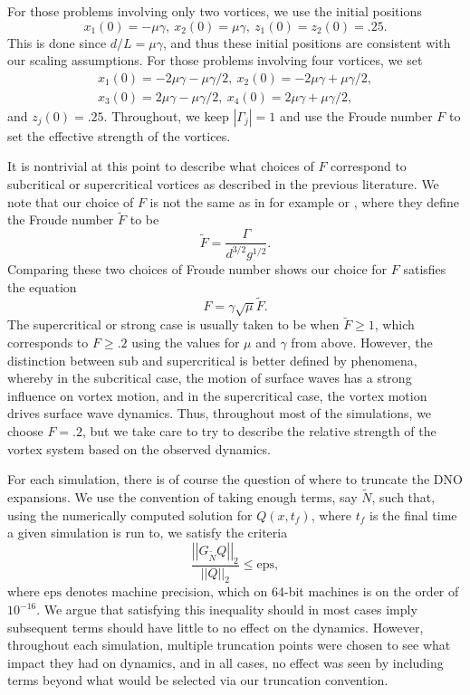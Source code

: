 \documentclass[a4paper,11pt]{article}
\newcommand{\gnorm}[1]{\left|\left| #1\right|\right|}
\begin{document}
For those problems involving only two vortices, we use the initial positions
\[
x_{1}(0)=-\mu\gamma, ~x_{2}(0)=\mu\gamma, ~z_{1}(0)=z_{2}(0)=.25.
\]
This is done since $d/L=\mu\gamma$, and thus these initial positions are consistent with our scaling assumptions.  For those problems involving four vortices, we set 
\begin{align*}
x_{1}(0)=-2\mu\gamma-\mu\gamma/2, ~ x_{2}(0)=-2\mu\gamma+\mu\gamma/2,\\ x_{3}(0)=2\mu\gamma-\mu\gamma/2, ~ x_{4}(0)=2\mu\gamma+\mu\gamma/2,
\end{align*}
and $z_{j}(0)=.25$.  Throughout, we keep $|\Gamma_{j}|=1$ and use the Froude number $F$ to set the effective strength of the vortices.  

It is nontrivial at this point to describe what choices of $F$ correspond to subcritical or supercritical vortices as described in the previous literature.  We note that our choice of $F$ is not the same as in for example \cite{tyvand1} or \cite{telste}, where they define the Froude number $\tilde{F}$ to be  
\[
\tilde{F} = \frac{\Gamma}{d^{3/2}g^{1/2}}.
\] 
Comparing these two choices of Froude number shows our choice for $F$ satisfies the equation 
\[
F = \gamma\sqrt{\mu}\tilde{F}.
\]  
The supercritical or strong case is usually taken to be when $\tilde{F}\geq 1$, which corresponds to $F\geq .2$ using the values for $\mu$ and $\gamma$ from above.  However, the distinction between sub and supercritical is better defined by phenomena, whereby in the subcritical case, the motion of surface waves has a strong influence on vortex motion, and in the supercritical case, the vortex motion drives surface wave dynamics.  Thus, throughout most of the simulations, we choose $F=.2$, but we take care to try to describe the relative strength of the vortex system based on the observed dynamics.  

For each simulation, there is of course the question of where to truncate the DNO expansions.  We use the convention of taking enough terms, say $\tilde{N}$, such that, using the numerically computed solution for $Q(x,t_{f})$, where $t_{f}$ is the final time a given simulation is run to, we satisfy the criteria  
\[
\frac{\gnorm{G_{\tilde{N}} Q}_{2}}{\gnorm{Q}_{2}} \leq \mbox{eps},
\]
where $\mbox{eps}$ denotes machine precision, which on 64-bit machines is on the order of $10^{-16}$.  We argue that satisfying this inequality should in most cases imply subsequent terms should have little to no effect on the dynamics.  However, throughout each simulation, multiple truncation points were chosen to see what impact they had on dynamics, and in all cases, no effect was seen by including terms beyond what would be selected via our truncation convention.
\end{document}

